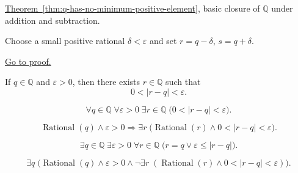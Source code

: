 \begin{remark*}[Dependencies]
\hyperref[thm:q-has-no-minimum-positive-element]{Theorem~\ref*{thm:q-has-no-minimum-positive-element}},
basic closure of $\mathbb{Q}$ under addition and subtraction.
\end{remark*}

\begin{remark*}
Choose a small positive rational $\delta<\varepsilon$ and set
$r=q-\delta$, $s=q+\delta$.
\end{remark*}

\begin{remark*}[Proof]
\hyperref[prf:rational-upper-lower-perturbation]{Go to proof.}
\end{remark*}

\begin{tcolorbox}[colback=thmbox, colframe=thmborder, arc=2pt,
  left=6pt, right=6pt, top=4pt, bottom=4pt,
  title={\small\textbf{Lemma (Rational Perturbation Lemma)}},
  fonttitle=\small\bfseries]
\begin{lemma}
\label{lem:rational-perturbation-lemma}
If $q\in\mathbb{Q}$ and $\varepsilon>0$, then there exists $r\in\mathbb{Q}$
such that
\[
0<|r-q|<\varepsilon.
\]
\end{lemma}
\end{tcolorbox}

\begin{remark*}
\[
\forall q\in\mathbb{Q}\;\forall \varepsilon>0\;
\exists r\in\mathbb{Q}\;
\bigl(0<|r-q|<\varepsilon\bigr).
\]
\end{remark*}

\begin{remark*}
\[
\operatorname{Rational}(q)\land \varepsilon>0
\Longrightarrow
\exists r\;\bigl(\operatorname{Rational}(r)\land 0<|r-q|<\varepsilon\bigr).
\]
\end{remark*}

\begin{remark*}
\[
\exists q\in\mathbb{Q}\;\exists \varepsilon>0\;
\forall r\in\mathbb{Q}\;
\bigl(r=q \lor \varepsilon\le |r-q|\bigr).
\]
\end{remark*}

\begin{remark*}
\[
\exists q\;\bigl(\operatorname{Rational}(q)\land \varepsilon>0 \land
\neg\exists r\;(\operatorname{Rational}(r)\land 0<|r-q|<\varepsilon)\bigr).
\]
\end{remark*}

